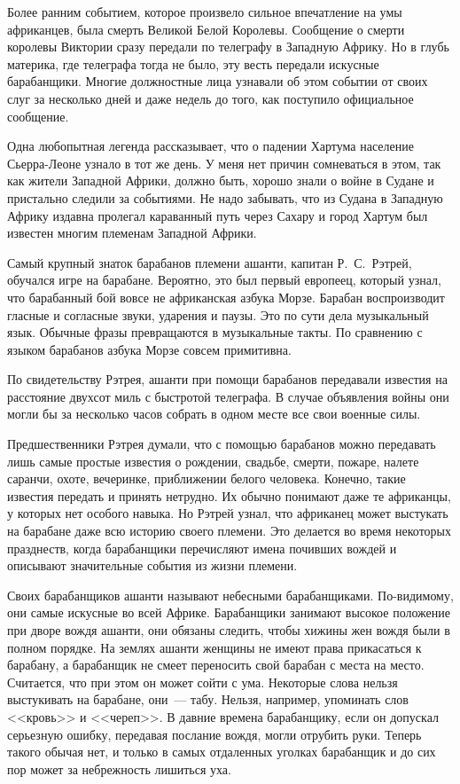 \documentclass[12pt,a4paper,twoside,openany,svgnames]{memoir}
\begin{document}
Более ранним событием, которое произвело сильное впечатление на умы африканцев, была смерть Великой Белой Королевы. Сообщение о смерти королевы Виктории сразу передали по телеграфу в Западную Африку. Но в глубь материка, где телеграфа тогда не было, эту весть передали искусные барабанщики. Многие должностные лица узнавали об этом событии от своих слуг за несколько дней и даже недель до того, как поступило официальное сообщение.

Одна любопытная легенда рассказывает, что о падении Хартума население Сьерра-Леоне узнало в тот же день. У меня нет причин сомневаться в этом, так как жители Западной Африки, должно быть, хорошо знали о войне в Судане и пристально следили за событиями. Не надо забывать, что из Судана в Западную Африку издавна пролегал караванный путь через Сахару и город Хартум был известен многим племенам Западной Африки.

Самый крупный знаток барабанов племени ашанти, капитан Р.~С.~Рэтрей, обучался игре на барабане. Вероятно, это был первый европеец, который узнал, что барабанный бой вовсе не африканская азбука Морзе. Барабан воспроизводит гласные и согласные звуки, ударения и паузы. Это по сути дела музыкальный язык. Обычные фразы превращаются в музыкальные такты. По сравнению с языком барабанов азбука Морзе совсем примитивна.

По свидетельству Рэтрея, ашанти при помощи барабанов передавали известия на расстояние двухсот миль с быстротой телеграфа. В случае объявления войны они могли бы за несколько часов собрать в одном месте все свои военные силы.

Предшественники Рэтрея думали, что с помощью барабанов можно передавать лишь самые простые известия о рождении, свадьбе, смерти, пожаре, налете саранчи, охоте, вечеринке, приближении белого человека. Конечно, такие известия передать и принять нетрудно. Их обычно понимают даже те африканцы, у которых нет особого навыка. Но Рэтрей узнал, что африканец может выстукать на барабане даже всю историю своего племени. Это делается во время некоторых празднеств, когда барабанщики перечисляют имена почивших вождей и описывают значительные события из жизни племени.

Своих барабанщиков ашанти называют небесными барабанщиками. По-видимому, они самые искусные во всей Африке. Барабанщики занимают высокое положение при дворе вождя ашанти, они обязаны следить, чтобы хижины жен вождя были в полном порядке. На землях ашанти женщины не имеют права прикасаться к барабану, а барабанщик не смеет переносить свой барабан с места на место. Считается, что при этом он может сойти с ума. Некоторые слова нельзя выстукивать на барабане, они~--- табу. Нельзя, например, упоминать слов <<кровь>> и <<череп>>. В давние времена барабанщику, если он допускал серьезную ошибку, передавая послание вождя, могли отрубить руки. Теперь такого обычая нет, и только в самых отдаленных уголках барабанщик и до сих пор может за небрежность лишиться уха.
\end{document}
